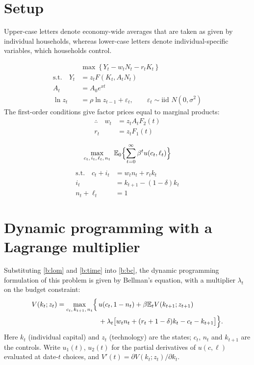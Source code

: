 \documentclass[11pt]{article}
\begin{document}


\section{Setup}

 Upper-case letters denote economy-wide averages that are taken as
given by individual households, whereas lower-case letters denote individual-specific
variables, which households control.

\begin{align}
  &\max\ \bigl\{\,Y_t-w_tN_t-r_tK_t\,\bigr\} \tag{1}\label{b:fp}\\
  \text{s.t.}\quad Y_t &= z_tF(K_t,A_tN_t) \tag{2}\label{b:prod}\\
  A_t &= A_0e^{xt} \tag{3}\label{b:A}\\
  \ln z_t &= \rho\ln z_{t-1}+\varepsilon_t,\qquad
     \varepsilon_t\sim\text{iid } N(0,\sigma^2) \tag{4}\label{b:z}
\end{align}
The first-order conditions give factor prices equal to marginal products:
\begin{align}
  \therefore\quad w_t &= z_tA_tF_2(t) \tag{5}\label{b:w}\\
  r_t &= z_tF_1(t) \tag{6}\label{b:r}
\end{align}

\[ \max_{c_t,\,i_t,\,\ell_t,\,n_t}\ \E_0\Bigl\{\sum_{t=0}^{\infty}\beta^t u(c_t,\ell_t)\Bigr\} \]
\begin{align}
  \text{s.t.}\quad c_t+i_t &= w_tn_t+r_tk_t \tag{7}\label{b:bc}\\
  i_t &= k_{t+1}-(1-\delta)k_t \tag{8}\label{b:lom}\\
  n_t+\ell_t &= 1 \tag{9}\label{b:time}
\end{align}


\section{Dynamic programming with a Lagrange multiplier}

Substituting \eqref{b:lom} and \eqref{b:time} into \eqref{b:bc}, the dynamic programming
formulation of this problem is given by Bellman's equation, with a multiplier
$\lambda_t$ on the budget constraint:
\begin{align*}
  V(k_t;z_t)=\max_{c_t,\,k_{t+1},\,n_t}\Bigl\{\,& u(c_t,1-n_t)+\beta\mathbb{E}_tV(k_{t+1};z_{t+1})\\
  &+\lambda_t\bigl[w_tn_t+(r_t+1-\delta)k_t-c_t-k_{t+1}\bigr]\Bigr\}.
\end{align*}
Here $k_t$ (individual capital) and $z_t$ (technology) are the states; $c_t$, $n_t$ and
$k_{t+1}$ are the controls. Write $u_1(t)$, $u_2(t)$ for the partial derivatives of
$u(c,\ell)$ evaluated at date-$t$ choices, and $V'(t)=\partial V(k_t;z_t)/\partial k_t$.
\end{document}
